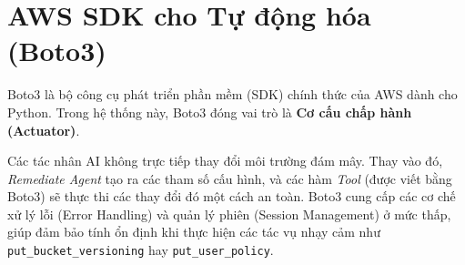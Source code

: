 \section{AWS SDK cho Tự động hóa (Boto3)}
Boto3 là bộ công cụ phát triển phần mềm (SDK) chính thức của AWS dành cho Python. Trong hệ thống này, Boto3 đóng vai trò là \textbf{Cơ cấu chấp hành (Actuator)}.

Các tác nhân AI không trực tiếp thay đổi môi trường đám mây. Thay vào đó, \textit{Remediate Agent} tạo ra các tham số cấu hình, và các hàm \textit{Tool} (được viết bằng Boto3) sẽ thực thi các thay đổi đó một cách an toàn. Boto3 cung cấp các cơ chế xử lý lỗi (Error Handling) và quản lý phiên (Session Management) ở mức thấp, giúp đảm bảo tính ổn định khi thực hiện các tác vụ nhạy cảm như \texttt{put\_bucket\_versioning} hay \texttt{put\_user\_policy}.


